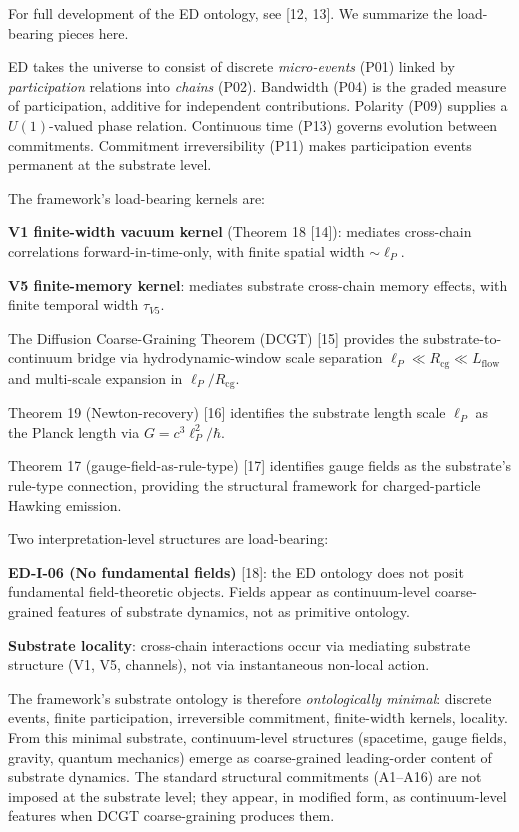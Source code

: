 \documentclass[11pt,a4paper]{article}
\begin{document}
For full development of the ED ontology, see [12, 13]. We summarize the load-bearing pieces here.

ED takes the universe to consist of discrete \emph{micro-events} (P01) linked by \emph{participation} relations into \emph{chains} (P02). Bandwidth (P04) is the graded measure of participation, additive for independent contributions. Polarity (P09) supplies a $U(1)$-valued phase relation. Continuous time (P13) governs evolution between commitments. Commitment irreversibility (P11) makes participation events permanent at the substrate level.

The framework's load-bearing kernels are:

\textbf{V1 finite-width vacuum kernel} (Theorem 18 [14]): mediates cross-chain correlations forward-in-time-only, with finite spatial width $\sim \ell_P$.

\textbf{V5 finite-memory kernel}: mediates substrate cross-chain memory effects, with finite temporal width $\tau_{V5}$.

The Diffusion Coarse-Graining Theorem (DCGT) [15] provides the substrate-to-continuum bridge via hydrodynamic-window scale separation $\ell_P \ll R_{\mathrm{cg}} \ll L_{\mathrm{flow}}$ and multi-scale expansion in $\ell_P/R_{\mathrm{cg}}$.

Theorem 19 (Newton-recovery) [16] identifies the substrate length scale $\ell_P$ as the Planck length via $G = c^3 \ell_P^2 / \hbar$.

Theorem 17 (gauge-field-as-rule-type) [17] identifies gauge fields as the substrate's rule-type connection, providing the structural framework for charged-particle Hawking emission.

Two interpretation-level structures are load-bearing:

\textbf{ED-I-06 (No fundamental fields)} [18]: the ED ontology does not posit fundamental field-theoretic objects. Fields appear as continuum-level coarse-grained features of substrate dynamics, not as primitive ontology.

\textbf{Substrate locality}: cross-chain interactions occur via mediating substrate structure (V1, V5, channels), not via instantaneous non-local action.

The framework's substrate ontology is therefore \emph{ontologically minimal}: discrete events, finite participation, irreversible commitment, finite-width kernels, locality. From this minimal substrate, continuum-level structures (spacetime, gauge fields, gravity, quantum mechanics) emerge as coarse-grained leading-order content of substrate dynamics. The standard structural commitments (A1--A16) are not imposed at the substrate level; they appear, in modified form, as continuum-level features when DCGT coarse-graining produces them.
\end{document}
